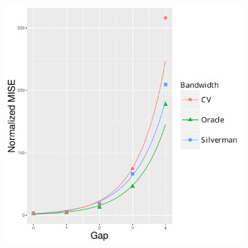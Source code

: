 \begin{figure}[htbp]
\begin{subfigure}[b]{0.24\textwidth}
        \caption{}
        \label{fig:ise:p1.4_100_Gap_risk:rmise}
    \end{subfigure}
    \begin{subfigure}[b]{0.24\textwidth}
        \includegraphics[width=\textwidth]{results/by_pop_risk_distance/NMISE-vs-population-risk-gap}
        \caption{}
        \label{fig:ise:p1.4_100_Gap_risk:nmise}
    \end{subfigure}


\end{figure}
